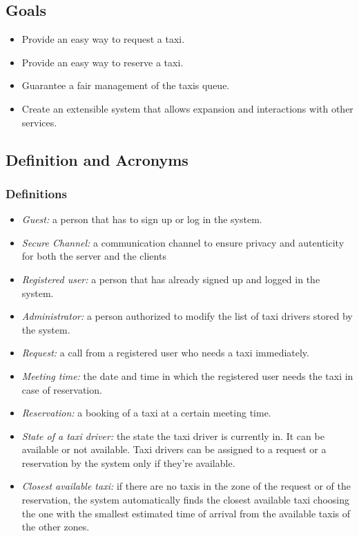 \documentclass{article}
\begin{document}
\subsection{Goals}
\begin{itemize}
	\item Provide an easy way to request a taxi.
	\item Provide an easy way to reserve a taxi.
	\item Guarantee a fair management of the taxis queue.
	\item Create an extensible system that allows expansion and interactions with other services.
\end{itemize}

\subsection{Definition and Acronyms}

\subsubsection{Definitions}
\begin{itemize}
	\item \textit{Guest:} a person that has to sign up or log in the system.
	\item \textit{Secure Channel:} a communication channel to ensure privacy and autenticity for both the server and the clients %
	\item \textit{Registered user:} a person that has already signed up and logged in the system. %
	\item \textit{Administrator:} a person authorized to modify the list of taxi drivers stored by the system.
	\item \textit{Request:} a call from a registered user who needs a taxi immediately.
	\item \textit{Meeting time:} the date and time in which the registered user needs the taxi in case of reservation.
	\item \textit{Reservation:} a booking of a taxi at a certain meeting time.
	\item \textit{State of a taxi driver:} the state the taxi driver is currently in. It can be available or not available. Taxi drivers can be assigned to a request or a reservation by the system only if they're available.
	\item \textit{Closest available taxi:} if there are no taxis in the zone of the request or of the reservation, the system automatically finds the closest available taxi choosing the one with the smallest estimated time of arrival from the available taxis of the other zones.
\end{itemize}
\end{document}
